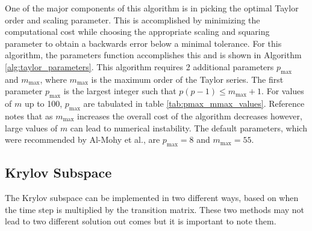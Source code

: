 One of the major components of this algorithm is in picking the optimal Taylor order and scaling parameter. This is accomplished by minimizing the computational cost while choosing the appropriate scaling and squaring parameter to obtain a backwards error below a minimal tolerance. For this algorithm, the parameters function accomplishes this and is shown in Algorithm \ref{alg:taylor_parameters}. This algorithm requires 2 additional parameters $p_{\text{max}}$ and $m_{\text{max}}$, where $m_{\text{max}}$ is the maximum order of the Taylor series. The first parameter $p_{\text{max}}$ is the largest integer such that $p(p - 1) \leq m_{\text{max}} + 1$. For values of $m$ up to 100, $p_{\text{max}}$ are tabulated in table \ref{tab:pmax_mmax_values}. Reference \cite{higham2011} notes that as $m_{\text{max}}$ increases the overall cost of the algorithm decreases however, large values of $m$ can lead to numerical instability. The default parameters, which were recommended by Al-Mohy et al., are $p_{\text{max}} = 8$ and $m_{\text{max}} = 55$.  

\subsection{Krylov Subspace}
\label{sec:krylovSubspace}
The Krylov subspace can be implemented in two different ways, based on when the time step is multiplied by the transition matrix. These two methods may not lead to two different solution out comes but it is important to note them. 
 